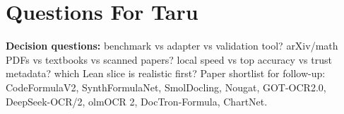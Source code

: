\documentclass[10pt]{article}
\begin{document}
\section{Questions For Taru}

\textbf{Decision questions:} benchmark vs adapter vs validation tool? arXiv/math PDFs vs textbooks vs scanned papers? local speed vs top accuracy vs trust metadata? which Lean slice is realistic first? Paper shortlist for follow-up: CodeFormulaV2, SynthFormulaNet, SmolDocling, Nougat, GOT-OCR2.0, DeepSeek-OCR/2, olmOCR 2, DocTron-Formula, ChartNet.
\end{document}
